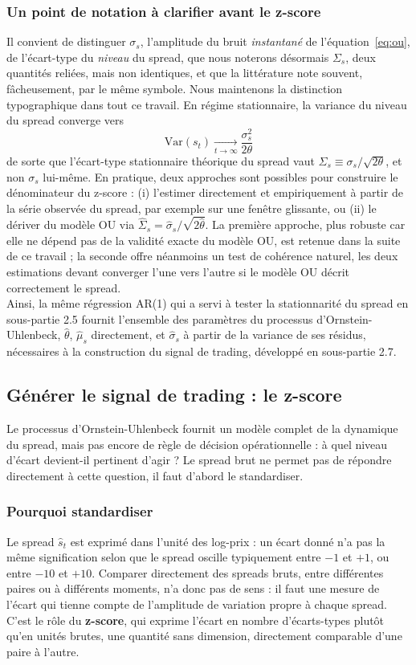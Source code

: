 \documentclass{article}
\begin{document}
\subsubsection*{Un point de notation à clarifier avant le z-score}
Il convient de distinguer $\sigma_s$, l'amplitude du bruit \emph{instantané} de l'équation~\eqref{eq:ou}, de l'écart-type du \emph{niveau} du spread, que nous noterons désormais $\Sigma_s$, deux quantités reliées, mais non identiques, et que la littérature note souvent, fâcheusement, par le même symbole. Nous maintenons la distinction typographique dans tout ce travail. En régime stationnaire, la variance du niveau du spread converge vers
\begin{equation}
\text{Var}(s_t) \xrightarrow[t\to\infty]{} \frac{\sigma_s^2}{2\theta}
\end{equation}
de sorte que l'écart-type stationnaire théorique du spread vaut $\Sigma_s \equiv \sigma_s/\sqrt{2\theta}$, et non $\sigma_s$ lui-même. En pratique, deux approches sont possibles pour construire le dénominateur du z-score : (i) l'estimer directement et empiriquement à partir de la série observée du spread, par exemple sur une fenêtre glissante, ou (ii) le dériver du modèle OU via $\hat\Sigma_s = \hat\sigma_s/\sqrt{2\hat\theta}$. La première approche, plus robuste car elle ne dépend pas de la validité exacte du modèle OU, est retenue dans la suite de ce travail ; la seconde offre néanmoins un test de cohérence naturel, les deux estimations devant converger l'une vers l'autre si le modèle OU décrit correctement le spread. \\
Ainsi, la même régression AR(1) qui a servi à tester la stationnarité du spread en sous-partie 2.5 fournit l'ensemble des paramètres du processus d'Ornstein-Uhlenbeck, $\hat\theta$, $\hat\mu_s$ directement, et $\hat\sigma_s$ à partir de la variance de ses résidus, nécessaires à la construction du signal de trading, développé en sous-partie 2.7.
\subsection{Générer le signal de trading : le z-score}
Le processus d'Ornstein-Uhlenbeck fournit un modèle complet de la dynamique du spread, mais pas encore de règle de décision opérationnelle : à quel niveau d'écart devient-il pertinent d'agir ? Le spread brut ne permet pas de répondre directement à cette question, il faut d'abord le standardiser.
\subsubsection*{Pourquoi standardiser}
Le spread $\hat{s}_t$ est exprimé dans l'unité des log-prix : un écart donné n'a pas la même signification selon que le spread oscille typiquement entre $-1$ et $+1$, ou entre $-10$ et $+10$. Comparer directement des spreads bruts, entre différentes paires ou à différents moments, n'a donc pas de sens : il faut une mesure de l'écart qui tienne compte de l'amplitude de variation propre à chaque spread. C'est le rôle du \textbf{z-score}, qui exprime l'écart en nombre d'écarts-types plutôt qu'en unités brutes, une quantité sans dimension, directement comparable d'une paire à l'autre.
\end{document}
